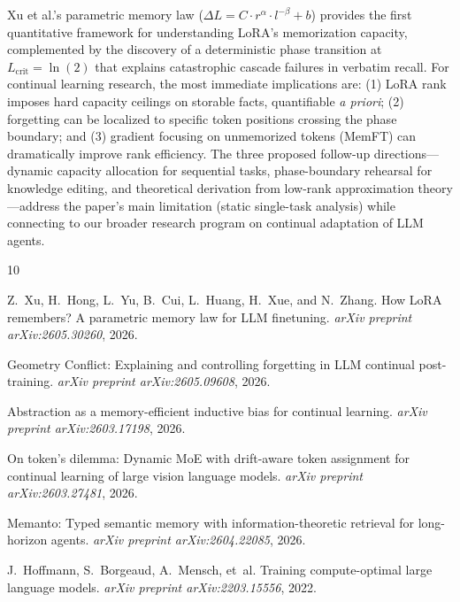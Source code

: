 \documentclass[11pt,a4paper]{article}
\begin{document}
Xu et al.'s parametric memory law ($\Delta L = C \cdot r^{\alpha} \cdot l^{-\beta} + b$) provides the first quantitative framework for understanding LoRA's memorization capacity, complemented by the discovery of a deterministic phase transition at $L_{\mathrm{crit}} = \ln(2)$ that explains catastrophic cascade failures in verbatim recall. For continual learning research, the most immediate implications are: (1) LoRA rank imposes hard capacity ceilings on storable facts, quantifiable \emph{a priori}; (2) forgetting can be localized to specific token positions crossing the phase boundary; and (3) gradient focusing on unmemorized tokens (MemFT) can dramatically improve rank efficiency. The three proposed follow-up directions---dynamic capacity allocation for sequential tasks, phase-boundary rehearsal for knowledge editing, and theoretical derivation from low-rank approximation theory---address the paper's main limitation (static single-task analysis) while connecting to our broader research program on continual adaptation of LLM agents.


\begin{thebibliography}{10}

Z.~Xu, H.~Hong, L.~Yu, B.~Cui, L.~Huang, H.~Xue, and N.~Zhang.
\newblock How {LoRA} remembers? {A} parametric memory law for {LLM} finetuning.
\newblock \emph{arXiv preprint arXiv:2605.30260}, 2026.

Geometry Conflict: Explaining and controlling forgetting in {LLM} continual post-training.
\newblock \emph{arXiv preprint arXiv:2605.09608}, 2026.

Abstraction as a memory-efficient inductive bias for continual learning.
\newblock \emph{arXiv preprint arXiv:2603.17198}, 2026.

On token's dilemma: Dynamic {MoE} with drift-aware token assignment for continual learning of large vision language models.
\newblock \emph{arXiv preprint arXiv:2603.27481}, 2026.

Memanto: Typed semantic memory with information-theoretic retrieval for long-horizon agents.
\newblock \emph{arXiv preprint arXiv:2604.22085}, 2026.

J.~Hoffmann, S.~Borgeaud, A.~Mensch, et~al.
\newblock Training compute-optimal large language models.
\newblock \emph{arXiv preprint arXiv:2203.15556}, 2022.

\end{thebibliography}
\end{document}
